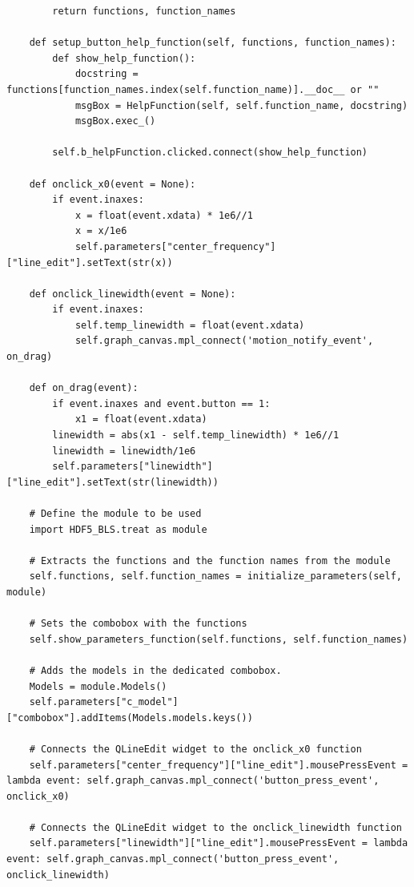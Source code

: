 \documentclass[a4paper,12pt]{article}
\begin{document}
\begin{enumerate}
\begin{lstlisting}
        return functions, function_names

    def setup_button_help_function(self, functions, function_names):
        def show_help_function():
            docstring = functions[function_names.index(self.function_name)].__doc__ or ""
            msgBox = HelpFunction(self, self.function_name, docstring)
            msgBox.exec_()

        self.b_helpFunction.clicked.connect(show_help_function)

    def onclick_x0(event = None):
        if event.inaxes:
            x = float(event.xdata) * 1e6//1
            x = x/1e6
            self.parameters["center_frequency"]["line_edit"].setText(str(x))
    
    def onclick_linewidth(event = None):
        if event.inaxes:
            self.temp_linewidth = float(event.xdata)
            self.graph_canvas.mpl_connect('motion_notify_event', on_drag)

    def on_drag(event):
        if event.inaxes and event.button == 1:
            x1 = float(event.xdata)
        linewidth = abs(x1 - self.temp_linewidth) * 1e6//1
        linewidth = linewidth/1e6
        self.parameters["linewidth"]["line_edit"].setText(str(linewidth))

    # Define the module to be used 
    import HDF5_BLS.treat as module 

    # Extracts the functions and the function names from the module
    self.functions, self.function_names = initialize_parameters(self, module)

    # Sets the combobox with the functions
    self.show_parameters_function(self.functions, self.function_names)

    # Adds the models in the dedicated combobox.
    Models = module.Models()
    self.parameters["c_model"]["combobox"].addItems(Models.models.keys())

    # Connects the QLineEdit widget to the onclick_x0 function
    self.parameters["center_frequency"]["line_edit"].mousePressEvent = lambda event: self.graph_canvas.mpl_connect('button_press_event', onclick_x0)
    
    # Connects the QLineEdit widget to the onclick_linewidth function
    self.parameters["linewidth"]["line_edit"].mousePressEvent = lambda event: self.graph_canvas.mpl_connect('button_press_event', onclick_linewidth)


\end{lstlisting}
\end{enumerate}
\end{document}
